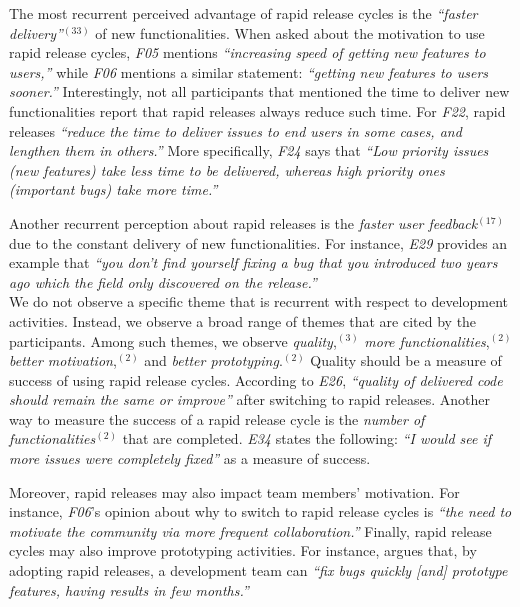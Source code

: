 \noindent\DIFdelbegin \textit{\textbf{}%
}%
\DIFdelend \DIFaddbegin {} \DIFaddend The most recurrent perceived
advantage of rapid release cycles is the {\em ``faster delivery''}$^{(33)}$
of new functionalities. When asked about the motivation to use rapid release
cycles, {\em F05} mentions {\em ``increasing speed of getting new features to
users,''} while {\em F06} mentions a similar statement: {\em ``getting new features to
users sooner.''} Interestingly, not all participants that mentioned the time to
deliver new functionalities report that rapid releases always reduce such time.
For {\em F22}, rapid releases {\em ``reduce the time to deliver issues to end
users in some cases, and lengthen them in others.''} More specifically, {\em F24} 
says that {\em ``Low priority issues (new features) take less
time to be delivered, whereas high priority ones (important bugs) take more
time.''} 

Another recurrent perception about rapid releases is the {\em faster user
feedback}$^{(17)}$ due to the constant delivery of new functionalities. For
instance, {\em E29} provides an example that {\em ``you don't find yourself
fixing a bug that you introduced two years ago which the field only discovered on the
release.''}\\

\noindent\DIFdelbegin \textit{\textbf{}%
}%
\DIFdelend \DIFaddbegin {}
\DIFaddend We do not observe a specific theme that is recurrent with respect
to development activities. Instead, we observe a broad range of themes that are
cited by the participants. Among such themes, we observe {\em quality},$^{(3)}$
{\em more functionalities},$^{(2)}$ {\em better motivation},$^{(2)}$ and {\em
better prototyping}.$^{(2)}$ Quality should be a measure of success of using
rapid release cycles. According to {\em E26}, {\em ``quality of delivered code
should remain the same or improve''} after switching to rapid releases. Another
way to measure the success of a rapid release cycle is the {\em number of
functionalities}$^{(2)}$ that are completed. {\em E34} states the following: {\em
``I would see if more issues were completely fixed''} as a measure of success. 

Moreover, rapid releases may also impact team members' motivation. For instance,
{\em F06}'s opinion about why to switch to rapid release cycles is {\em ``the
need to motivate the community via more frequent collaboration.''} Finally,
rapid release cycles may also improve prototyping activities. For instance, {\em
\DIFdelbegin {}\DIFdelend \DIFaddbegin {}\DIFaddend } argues that, by adopting rapid releases, a development team can {\em ``fix
bugs quickly [and] prototype features, having results in few months.''}


